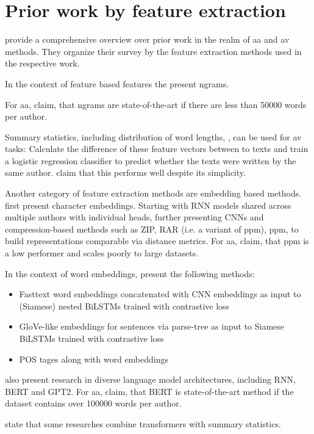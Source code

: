 \section{Prior work by feature extraction}
\label{sec:prior_work_by_feat_extraction}

\citet{tyo_state_2022} provide a comprehensive overview over prior work in the realm of \ac{aa} and \ac{av} methods.
They organize their survey by the feature extraction methods used in the respective work.

In the context of feature based features the present ngrams.

For \ac{aa}, \citet{tyo_state_2022} claim, that ngrams are state-of-the-art if there are less than 50000 words per author.

Summary statistics, including distribution of word lengths, , 
can be used for \ac{av} tasks: 
Calculate the difference of these feature vectors between to texts and train a logistic regression classifier 
to predict whether the texts were written by the same author.
\citet{tyo_state_2022} claim that this performs well despite its simplicity.


Another category of feature extraction methods are embedding based methods.
\citet{tyo_state_2022} first present character embeddings.
Starting with RNN models shared across multiple authors with individual heads, 
further presenting CNNs and %
compression-based methods such as ZIP, RAR (i.e. a variant of \ac{ppm}), \ac{ppm}, 
to build representations comparable via distance metrics.
For \ac{aa}, \citet{tyo_state_2022} claim, that \ac{ppm} is a low performer and scales poorly to large datasets.

In the context of word embeddings, \citet{tyo_state_2022} present the following methods:
\begin{itemize}
    \item Fasttext word embeddings concatenated with CNN embeddings as input to (Siamese) nested BiLSTMs trained with contrastive loss
    \item GloVe-like embeddings for sentences via parse-tree as input to Siamese BiLSTMs trained with contrastive loss
    \item POS tages along with word embeddings
\end{itemize}

\citet{tyo_state_2022} also present research in diverse language model architectures, including RNN, BERT and GPT2.
For \ac{aa}, \citet{tyo_state_2022} claim, that BERT is state-of-the-art method if the dataset contains over 100000 words per author.

\citet{tyo_state_2022} state that some researches combine transformers with summary statistics.
